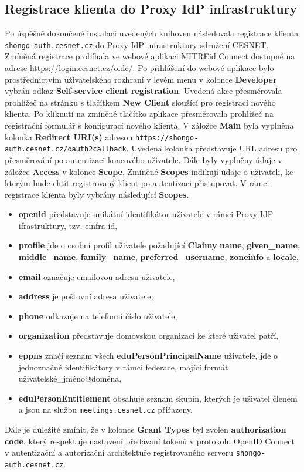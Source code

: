 \documentclass[
  printed, %
  twoside, %
  table,   %
  nolof,     %
  nolot,     %
]{fithesis3}
\begin{document}
\subsection{Registrace klienta do Proxy IdP infrastruktury}

Po úspěšně dokončené instalaci uvedených knihoven následovala registrace klienta \texttt{shongo-auth.cesnet.cz} do Proxy IdP infrastruktury sdružení CESNET. Zmíněná registrace probíhala ve webové aplikaci MITREid Connect dostupné na adrese \url{https://login.cesnet.cz/oidc/}. Po přihlášení do webové aplikace bylo prostřednictvím uživatelského rozhraní v levém menu v kolonce \textbf{Developer} vybrán odkaz \textbf{Self-service client registration}. Uvedená akce přesměrovala prohlížeč na stránku s tlačítkem \textbf{New Client} sloužící pro registraci nového klienta. Po kliknutí na zmíněné tlačítko aplikace přesměrovala prohlížeč na registrační formulář s konfigurací nového klienta. V záložce \textbf{Main} byla vyplněna kolonka \textbf{Redirect URI(s)} adresou \texttt{https://shongo-auth.cesnet.cz/oauth2callback}. Uvedená kolonka představuje URL adresu pro přesměrování po autentizaci koncového uživatele. Dále byly vyplněny údaje v záložce \textbf{Access} v kolonce \textbf{Scope}. Zmíněné \textbf{Scopes} indikují údaje o uživateli, ke kterým bude chtít registrovaný klient po autentizaci přistupovat. V rámci registrace klienta byly vybrány následující \textbf{Scopes}.
\begin{itemize}
    \item \textbf{openid} představuje unikátní identifikátor uživatele v rámci Proxy IdP ifrastruktury, tzv. einfra id,
    \item \textbf{profile} jde o osobní profil uživatele požadující \textbf{Claimy} \textbf{name}, \textbf{given\_name}, \textbf{middle\_name}, \textbf{family\_name}, \textbf{preferred\_username}, \textbf{zoneinfo} a \textbf{locale},
    \item \textbf{email} označuje emailovou adresu uživatele,
    \item \textbf{address} je poštovní adresa uživatele,
    \item \textbf{phone} odkazuje na telefonní číslo uživatele,
    
    \item \textbf{organization} představuje domovskou organizaci ke které uživatel patří,
    \item \textbf{eppns} značí seznam všech \textbf{eduPersonPrincipalName} uživatele, jde o jednoznačné identifikátory v rámci federace, mající formát uživatelské\_jméno@doména,  
    \item \textbf{eduPersonEntitlement} obsahuje seznam skupin, kterých je uživatel členem a jsou na službu \texttt{meetings.cesnet.cz} přiřazeny.
    
\end{itemize}
Dále je důležité zmínit, že v kolonce \textbf{Grant Types} byl zvolen \textbf{authorization code}, který respektuje nastavení předávaní tokenů v protokolu OpenID Connect v autentizační a autorizační architektuře registrovaného serveru \texttt{shongo-auth.cesnet.cz}.  \par
\end{document}
